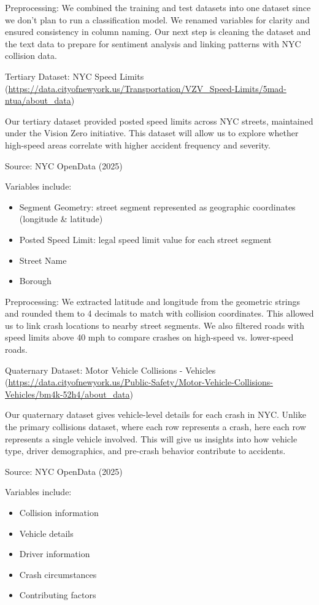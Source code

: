 \documentclass[10pt]{article}\usepackage[]{graphicx}\usepackage[]{xcolor}
\begin{document}
Preprocessing: We combined the training and test datasets into one dataset since we don’t plan to run a classification model. We renamed variables for clarity and ensured consistency in column naming. Our next step is cleaning the dataset and the text data to prepare for sentiment analysis and linking patterns with NYC collision data.

Tertiary Dataset: NYC Speed Limits (\url{https://data.cityofnewyork.us/Transportation/VZV_Speed-Limits/5mad-ntua/about_data}) 

Our tertiary dataset provided posted speed limits across NYC streets, maintained under the Vision Zero initiative. This dataset will allow us to explore whether high-speed areas correlate with higher accident frequency and severity.


Source: NYC OpenData (2025)


Variables include:
\begin{itemize}
  \item Segment Geometry: street segment represented as geographic coordinates (longitude \& latitude)
  \item Posted Speed Limit: legal speed limit value for each street segment
  \item Street Name
  \item Borough
\end{itemize}

Preprocessing: We extracted latitude and longitude from the geometric strings and rounded them to 4 decimals to match with collision coordinates. This allowed us to link crash locations to nearby street segments. We also filtered roads with speed limits above 40 mph to compare crashes on high-speed vs. lower-speed roads. 

Quaternary Dataset: Motor Vehicle Collisions - Vehicles (\url{https://data.cityofnewyork.us/Public-Safety/Motor-Vehicle-Collisions-Vehicles/bm4k-52h4/about_data}) 

Our quaternary dataset gives vehicle-level details for each crash in NYC. Unlike the primary collisions dataset, where each row represents a crash, here each row represents a single vehicle involved. This will give us insights into how vehicle type, driver demographics, and pre-crash behavior contribute to accidents.

Source: NYC OpenData (2025)


Variables include:
\begin{itemize}
  \item Collision information 
  \item Vehicle details 
  \item Driver information
  \item Crash circumstances 
  \item Contributing factors 
\end{itemize}
\end{document}

